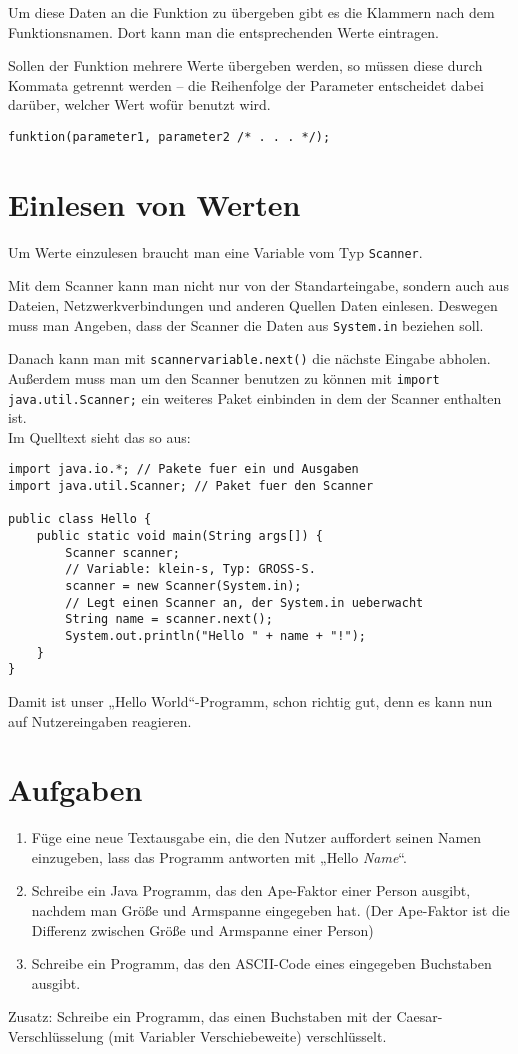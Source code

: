 Um diese Daten an die Funktion zu übergeben gibt es die Klammern nach dem Funktionsnamen. Dort kann man die entsprechenden Werte eintragen.

Sollen der Funktion mehrere Werte übergeben werden, so müssen diese durch Kommata getrennt werden – die Reihenfolge der Parameter entscheidet dabei darüber, welcher Wert wofür benutzt wird.
\begin{lstlisting}
funktion(parameter1, parameter2 /* . . . */);
\end{lstlisting}

\section {Einlesen von Werten}
Um Werte einzulesen braucht man eine Variable vom Typ \lstinline$Scanner$. 

Mit dem Scanner kann man nicht nur von der Standarteingabe, sondern auch aus Dateien, Netzwerkverbindungen und anderen Quellen Daten einlesen. 
Deswegen muss man Angeben, dass der Scanner die Daten aus \lstinline$System.in$ beziehen soll.

Danach kann man mit \lstinline$scannervariable.next()$ die nächste Eingabe abholen.
Außerdem muss man um den Scanner benutzen zu können mit \lstinline$import java.util.Scanner;$ ein weiteres Paket einbinden in dem der Scanner enthalten ist. \\
Im Quelltext sieht das so aus:
\begin{lstlisting}
import java.io.*; // Pakete fuer ein und Ausgaben
import java.util.Scanner; // Paket fuer den Scanner

public class Hello {
	public static void main(String args[]) {
		Scanner scanner;	
		// Variable: klein-s, Typ: GROSS-S.
		scanner = new Scanner(System.in); 
		// Legt einen Scanner an, der System.in ueberwacht
		String name = scanner.next();
		System.out.println("Hello " + name + "!");
	}
}
\end{lstlisting}
Damit ist unser „Hello World“-Programm, schon richtig gut, denn es kann nun auf Nutzereingaben reagieren.

\section {Aufgaben}
\begin{enumerate}
\item Füge eine neue Textausgabe ein, die den Nutzer auffordert seinen Namen einzugeben, lass das Programm antworten mit „Hello \textit{Name}“.
\item Schreibe ein Java Programm, das den Ape-Faktor einer Person ausgibt, nachdem man Größe und Armspanne eingegeben hat. (Der Ape-Faktor ist die Differenz zwischen Größe und Armspanne einer Person)
\item Schreibe ein Programm, das den ASCII-Code eines eingegeben Buchstaben ausgibt.
\end{enumerate}

Zusatz: Schreibe ein Programm, das einen Buchstaben mit der Caesar-Verschlüsselung (mit Variabler Verschiebeweite) verschlüsselt.
